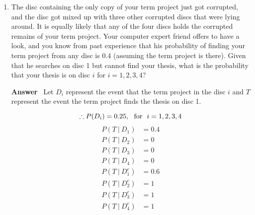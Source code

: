 \documentclass[paper=usletter, fontsize=12pt]{article}
\newcommand{\ans}{\textbf{Answer} \ }
\newcommand\given[1][]{\:#1\vert\:}
\begin{document}
\begin{enumerate}
\begin{enumerate}
                \item At least one of the numbers is greater than 1/3.

                \ans

                \item The two numbers are equal.

                \ans

                \item Alice's number is greater than 1/3.

                \ans

            \end{enumerate}

        Find the probabilities $P(A)$, $P(B)$, $P(A \cap B)$, $P(C)$, $P(D)$,
        $P(A \cap D)$,

        \item The disc containing the only copy of your term project just got
        corrupted, and the disc got mixed up with three other corrupted discs
        that were lying around. It is equally likely that any of the four discs
        holds the corrupted remains of your term project. Your computer expert
        friend offers to have a look, and you know from past experience that
        his probability of finding your term project from any disc is 0.4
        (assuming the term project is there). Given that he searches on disc 1
        but cannot find your thesis, what is the probability that your thesis
        is on disc $i$ for $i = 1, 2, 3, 4$?

        \ans Let $D_i$ represent the event that the term project in the disc
        $i$ and $T$ represent the event the term project finds the thesis on
        disc 1.

            \begin{equation*}
                \therefore P(D_i) = 0.25, \text{ \ for \ } i = 1, 2, 3, 4 \\
            \end{equation*}
            \begin{align*}
                P(T \given D_1) & = 0.4 \\
                P(T \given D_2) & = 0 \\
                P(T \given D_3) & = 0 \\
                P(T \given D_4) & = 0
            \end{align*}
            \begin{align*}
                P(T \given D_1^c) & = 0.6 \\
                P(T \given D_2^c) & = 1 \\
                P(T \given D_3^c) & = 1 \\
                P(T \given D_4^c) & = 1
            \end{align*}


\end{enumerate}
\end{document}
